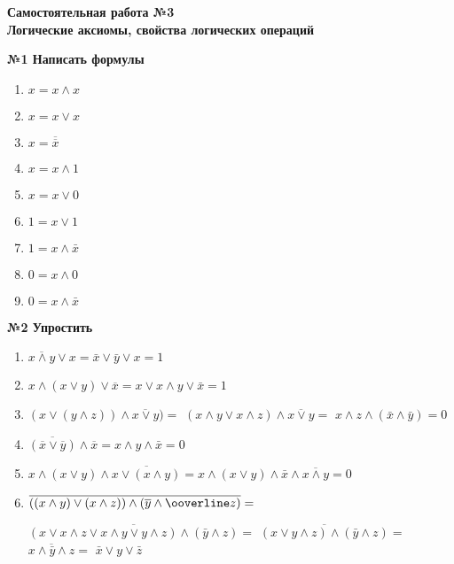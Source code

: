 



    \begin{center}
        \textbf{
            Самостоятельная работа №3\\Логические аксиомы, свойства логических операций
        }

        \textbf{№1 Написать формулы}
    \end{center}

    \begin{enumerate}
        \item $x = x \wedge x$
        \item $x = x \vee x$
        \item $x = \overline {\overline x}$
        \item $x = x \wedge 1$
        \item $x = x \vee 0$
        \item $1 = x \vee 1$
        \item $1 = x \wedge \bar x$
        \item $0 = x \wedge 0$
        \item $0 = x \wedge \bar x$
    \end{enumerate}

    \begin{center}
        \textbf{№2 Упростить}
    \end{center}

    \begin{enumerate}
        \item $\overline{x \wedge y} \vee x = \bar x \vee \bar y \vee x = 1$

        \item $x \wedge (x \vee y) \vee \overline x = x \vee x \wedge y \vee \bar x = 1$
        \item $(x \vee (y \wedge z))\wedge \overline{x \vee y}) = $
        $(x \wedge y \vee x \wedge z) \wedge \overline{x \vee y} = $
        $x \wedge z \wedge (\bar x \wedge \bar y) = 0$
        \item $\overline{(\overline x \vee \overline y)} \wedge \overline x = x \wedge y \wedge \bar x = 0$
        \item $x \wedge (x \vee y) \wedge \overline{x \vee (x \wedge y)} = x \wedge (x \vee y) \wedge \bar x \wedge \overline{x \wedge y} = 0$
        \item $\overline{((x \wedge y) \vee (x \wedge z)) \wedge (\overline y \wedge \ooverline z)} = $
        \begin{spacing}{1.2}
            $\overline{(x \vee x \wedge z \vee x \wedge y \vee y \wedge z) \wedge (\bar y \wedge z)} = $
            $\overline{(x \vee y \wedge z) \wedge (\bar y \wedge z)} = $\\
            $\overline{x \wedge \bar y \wedge z} = $
            $\bar x \vee y \vee \bar z$
        \end{spacing}
    \end{enumerate}

